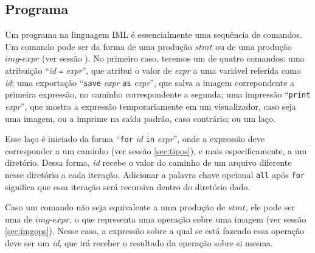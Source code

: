 \documentclass{article}
\begin{document}
\subsection{Programa}
\label{sec:programa}
Um programa na linguagem IML é essencialmente uma sequência de comandos. Um comando pode ser da forma de uma produção $stmt$ ou de uma produção $img\text{-}expr$ (ver sessão \label{sec:sintaxe}). No primeiro caso, teremos um de quatro comandos: uma atribuição ``\textit{id} \texttt{=} \textit{expr}'', que atribui o valor de \textit{expr} a uma variável referida como \textit{id}; uma exportação ``\texttt{save} \textit{expr} \texttt{as} \textit{expr}'', que salva a imagem correpondente a primeira expressão, no caminho correspondente a segunda; uma impressão ``\texttt{print} \textit{expr}'', que mostra a expressão temporariamente em um visualizador, caso seja uma imagem, ou a imprime na saída padrão, caso contrário; ou um laço.

Esse laço é iniciado da forma ``\texttt{for} \textit{id} \texttt{in} \textit{expr}'', onde a expressão  deve corresponder a um caminho (ver sessão \ref{sec:tipos}), e mais especificamente, a um diretório. Dessa forma, \textit{id} recebe o valor do caminho de um arquivo diferente nesse diretório a cada iteração. Adicionar a palavra chave opcional \texttt{all} após \texttt{for} significa que essa iteração será recursiva dentro do diretório dado.

Caso um comando não seja equivalente a uma produção de $stmt$, ele pode ser uma de $img\text{-}expr$, o que representa uma operação sobre uma imagem (ver sessão \ref{sec:imgops}). Nesse caso, a expressão sobre a qual se está fazendo essa operação deve ser um \textit{id}, que irá receber o resultado da operação sobre si mesma.
\end{document}
